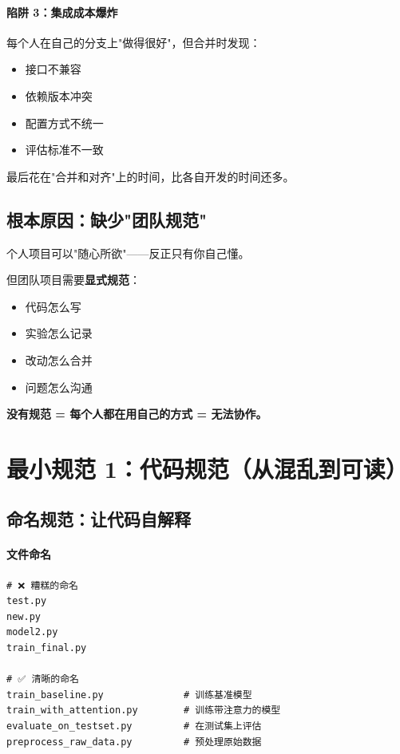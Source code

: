 \paragraph{陷阱 3：集成成本爆炸}

每个人在自己的分支上"做得很好"，但合并时发现：
\begin{itemize}
  \item 接口不兼容
  \item 依赖版本冲突
  \item 配置方式不统一
  \item 评估标准不一致
\end{itemize}

最后花在"合并和对齐"上的时间，比各自开发的时间还多。

\subsection{根本原因：缺少"团队规范"}

个人项目可以"随心所欲"——反正只有你自己懂。

但团队项目需要\textbf{显式规范}：
\begin{itemize}
  \item 代码怎么写
  \item 实验怎么记录
  \item 改动怎么合并
  \item 问题怎么沟通
\end{itemize}

\textbf{没有规范 = 每个人都在用自己的方式 = 无法协作。}

\section{最小规范 1：代码规范（从混乱到可读）}

\subsection{命名规范：让代码自解释}

\paragraph{文件命名}

\begin{verbatim}
# ❌ 糟糕的命名
test.py
new.py
model2.py
train_final.py

# ✅ 清晰的命名
train_baseline.py              # 训练基准模型
train_with_attention.py        # 训练带注意力的模型
evaluate_on_testset.py         # 在测试集上评估
preprocess_raw_data.py         # 预处理原始数据
\end{verbatim}

